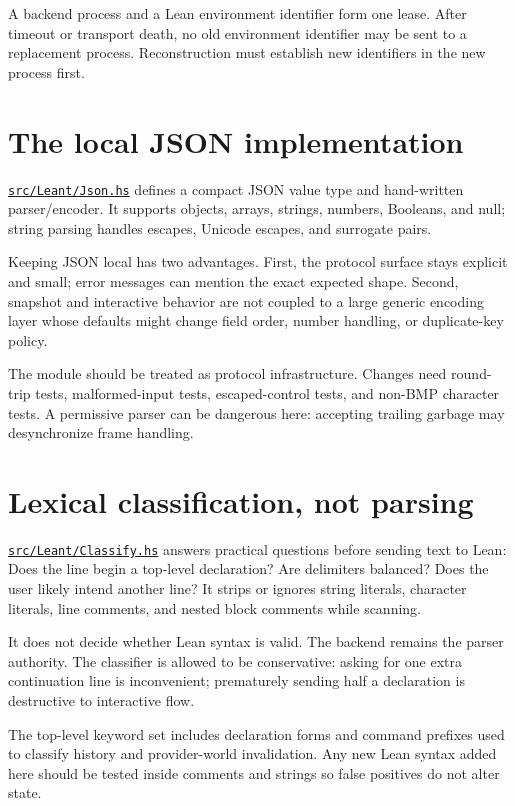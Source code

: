 \documentclass[10pt,letterpaper,oneside]{report}
\def\LeantBase{https://github.com/VladimirReshetnikov/Leant/blob/ada69d884480b93e74ee4b3daf77be38702ee07d/}
\newcommand{\lpath}[1]{\href{\LeantBase#1}{\nolinkurl{#1}}}
\begin{document}
\begin{invariantbox}
A backend process and a Lean environment identifier form one lease. After timeout or transport death, no old environment identifier may be sent to a replacement process. Reconstruction must establish new identifiers in the new process first.
\end{invariantbox}

\section{The local JSON implementation}

\lpath{src/Leant/Json.hs} defines a compact JSON value type and hand-written parser/encoder. It supports objects, arrays, strings, numbers, Booleans, and null; string parsing handles escapes, Unicode escapes, and surrogate pairs.

Keeping JSON local has two advantages. First, the protocol surface stays explicit and small; error messages can mention the exact expected shape. Second, snapshot and interactive behavior are not coupled to a large generic encoding layer whose defaults might change field order, number handling, or duplicate-key policy.

The module should be treated as protocol infrastructure. Changes need round-trip tests, malformed-input tests, escaped-control tests, and non-BMP character tests. A permissive parser can be dangerous here: accepting trailing garbage may desynchronize frame handling.

\section{Lexical classification, not parsing}

\lpath{src/Leant/Classify.hs} answers practical questions before sending text to Lean: Does the line begin a top-level declaration? Are delimiters balanced? Does the user likely intend another line? It strips or ignores string literals, character literals, line comments, and nested block comments while scanning.

It does not decide whether Lean syntax is valid. The backend remains the parser authority. The classifier is allowed to be conservative: asking for one extra continuation line is inconvenient; prematurely sending half a declaration is destructive to interactive flow.

The top-level keyword set includes declaration forms and command prefixes used to classify history and provider-world invalidation. Any new Lean syntax added here should be tested inside comments and strings so false positives do not alter state.
\end{document}
